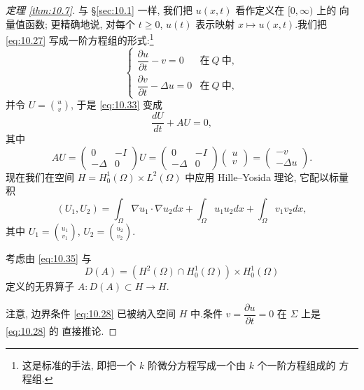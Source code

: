 \begin{proof}[定理 \ref{thm:10.7}]
与 \S \ref{sec:10.1} 一样, 我们把 $u(x,t)$ 看作定义在 $[0,\infty)$ 上的
向量值函数; 更精确地说, 对每个 $t\ge0$, $u(t)$ 表示映射
$x\mapsto u(x,t)$.我们把 \eqref{eq:10.27} 写成一阶方程组的形式:\footnote{
这是标准的手法, 即把一个 $k$ 阶微分方程写成一个由 $k$ 个一阶方程组成的
方程组.}
\begin{equation}
\begin{cases}
\dfrac{\partial u}{\partial t}-v=0 & \text{在}\ Q\ \text{中},\\[2mm]
\dfrac{\partial v}{\partial t}-\Delta u=0 & \text{在}\ Q\ \text{中},
\end{cases}
\label{eq:10.33}
\end{equation}
并令 $U=\binom{u}{v}$, 于是 \eqref{eq:10.33} 变成
\begin{equation}
\frac{dU}{dt}+AU=0,
\label{eq:10.34}
\end{equation}
其中
\begin{equation}
AU=\begin{pmatrix}0&-I\\-\Delta&0\end{pmatrix}U
=\begin{pmatrix}0&-I\\-\Delta&0\end{pmatrix}
\begin{pmatrix}u\\v\end{pmatrix}
=\begin{pmatrix}-v\\-\Delta u\end{pmatrix}.
\label{eq:10.35}
\end{equation}
现在我们在空间 $H=H_0^1(\Omega)\times L^2(\Omega)$ 中应用 Hille--Yosida
理论, 它配以标量积
\begin{equation*}
(U_1,U_2)=\int_\Omega\nabla u_1\cdot\nabla u_2dx+\int_\Omega u_1u_2dx
+\int_\Omega v_1v_2dx,
\end{equation*}
其中 $U_1=\binom{u_1}{v_1}$, $U_2=\binom{u_2}{v_2}$.

考虑由 \eqref{eq:10.35} 与
\begin{equation*}
D(A)=(H^2(\Omega)\cap H_0^1(\Omega))\times H_0^1(\Omega)
\end{equation*}
定义的无界算子 $A:D(A)\subset H\to H$.

注意, 边界条件 \eqref{eq:10.28} 已被纳入空间 $H$ 中.条件
$v=\dfrac{\partial u}{\partial t}=0$ 在 $\Sigma$ 上是 \eqref{eq:10.28} 的
直接推论.


\end{proof}

